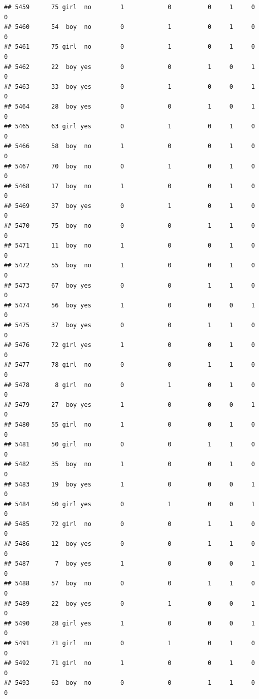 \documentclass[man]{apa6}
\begin{document}
\begin{verbatim}
## 5459      75 girl  no        1            0          0     1     0     0
## 5460      54  boy  no        0            1          0     1     0     0
## 5461      75 girl  no        0            1          0     1     0     0
## 5462      22  boy yes        0            0          1     0     1     0
## 5463      33  boy yes        0            1          0     0     1     0
## 5464      28  boy yes        0            0          1     0     1     0
## 5465      63 girl yes        0            1          0     1     0     0
## 5466      58  boy  no        1            0          0     1     0     0
## 5467      70  boy  no        0            1          0     1     0     0
## 5468      17  boy  no        1            0          0     1     0     0
## 5469      37  boy yes        0            1          0     1     0     0
## 5470      75  boy  no        0            0          1     1     0     0
## 5471      11  boy  no        1            0          0     1     0     0
## 5472      55  boy  no        1            0          0     1     0     0
## 5473      67  boy yes        0            0          1     1     0     0
## 5474      56  boy yes        1            0          0     0     1     0
## 5475      37  boy yes        0            0          1     1     0     0
## 5476      72 girl yes        1            0          0     1     0     0
## 5477      78 girl  no        0            0          1     1     0     0
## 5478       8 girl  no        0            1          0     1     0     0
## 5479      27  boy yes        1            0          0     0     1     0
## 5480      55 girl  no        1            0          0     1     0     0
## 5481      50 girl  no        0            0          1     1     0     0
## 5482      35  boy  no        1            0          0     1     0     0
## 5483      19  boy yes        1            0          0     0     1     0
## 5484      50 girl yes        0            1          0     0     1     0
## 5485      72 girl  no        0            0          1     1     0     0
## 5486      12  boy yes        0            0          1     1     0     0
## 5487       7  boy yes        1            0          0     0     1     0
## 5488      57  boy  no        0            0          1     1     0     0
## 5489      22  boy yes        0            1          0     0     1     0
## 5490      28 girl yes        1            0          0     0     1     0
## 5491      71 girl  no        0            1          0     1     0     0
## 5492      71 girl  no        1            0          0     1     0     0
## 5493      63  boy  no        0            0          1     1     0     0

\end{verbatim}
\end{document}
